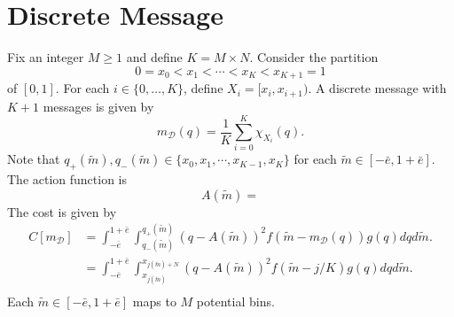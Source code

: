 \documentclass{article}
\begin{document}
\section{Discrete Message}
Fix an integer $M\geq1$ and define $K=M\times N$. Consider the partition
\begin{equation}
	0=x_{0}<x_{1}<\cdots<x_{K}<x_{K+1}=1
\end{equation}
of $[0,1]$. For each $i\in\{0,\ldots,K\}$, define $X_{i}=[x_{i},x_{i+1})$. A discrete message with $K+1$ messages is given by
\begin{equation}
	m_{\mathcal{D}}(q)=\frac{1}{K}\sum_{i=0}^{K}{\chi_{X_{i}}(q)}.
\end{equation}
Note that $q_{+}(\widetilde{m}),q_{-}(\widetilde{m})\in\{x_{0},x_{1},\cdots,x_{K-1},x_{K}\}$ for each $\widetilde{m}\in[-\bar{e},1+\bar{e}]$. The action function is
\begin{equation}
	A(\widetilde{m})=
\end{equation}
The cost is given by 
\begin{align}
	C[m_{\mathcal{D}}]&=\int_{-\bar{e}}^{1+\bar{e}}{\int_{q_{-}(\widetilde{m})}^{q_{+}(\widetilde{m})}{(q-A(\widetilde{m}))^{2}f(\widetilde{m}-m_{\mathcal{D}}(q))g(q)dq}d\widetilde{m}}.\\
	&=\int_{-\bar{e}}^{1+\bar{e}}{\int_{x_{j(\widetilde{m})}}^{x_{j(\widetilde{m})+N}}{(q-A(\widetilde{m}))^{2}f(\widetilde{m}-j/K)g(q)dq}d\widetilde{m}}.\\
\end{align}
Each $\widetilde{m}\in[-\bar{e},1+\bar{e}]$ maps to $M$ potential bins.
\end{document}

